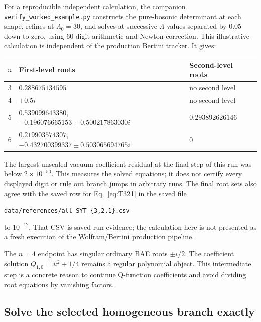 \documentclass[11pt]{article}
\newcommand{\file}[1]{\texttt{#1}}
\begin{document}
For a reproducible independent calculation, the companion
\file{verify\_worked\_example.py} constructs the pure-bosonic determinant
at each shape, refines at $\Lambda_0=30$, and solves at successive
$\Lambda$ values separated by $0.05$ down to zero, using 60-digit
arithmetic and Newton correction. This illustrative calculation is
independent of the production Bertini tracker. It gives:
\begin{center}
\begin{tabular}{@{}cll@{}}
\toprule
$n$ & First-level roots & Second-level roots\\
\midrule
3 & $0.288675134595$ & no second level\\
4 & $\pm0.5i$ & no second level\\
5 & $0.539099643380$, $-0.196076665153\pm0.500217863030i$
 & $0.293892626146$\\
6 & $0.219903574307$, $-0.432700399337\pm0.503065694765i$ & $0$\\
\bottomrule
\end{tabular}
\end{center}
The largest unscaled vacuum-coefficient residual at the final step of
this run was below $2\times10^{-50}$. This measures the solved equations;
it does not certify every displayed digit or rule out branch jumps in
arbitrary runs. The final root sets also agree with the saved row for
Eq.~\eqref{eq:T321} in the saved file
\begin{center}\file{data/references/all\_SYT\_\{3,2,1\}.csv}\end{center} to $10^{-12}$.
That CSV is saved-run evidence; the calculation here is not presented
as a fresh execution of the Wolfram/Bertini production pipeline.

The $n=4$ endpoint has singular ordinary BAE roots $\pm i/2$.
The coefficient solution $Q_{1,0}=u^2+1/4$ remains a regular polynomial
object. This intermediate step is a concrete reason to continue Q-function
coefficients and avoid dividing root equations by vanishing factors.

\subsection{Solve the selected homogeneous branch exactly}
\end{document}
